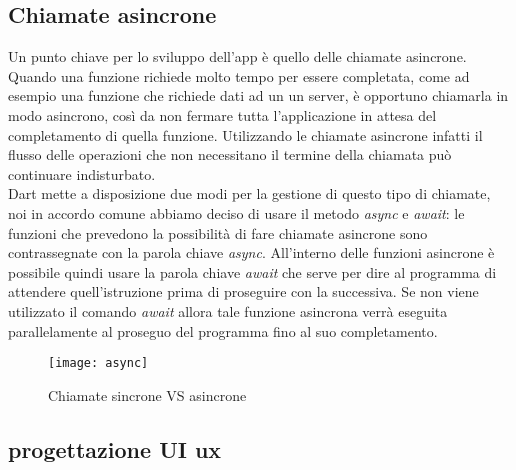 \subsection{Chiamate asincrone}
Un punto chiave per lo sviluppo dell'app è quello delle chiamate asincrone.\\
Quando una funzione richiede molto tempo per essere completata, come ad esempio una funzione che richiede dati ad un un server, è opportuno chiamarla in modo asincrono, così da non fermare tutta l'applicazione in attesa del completamento di quella funzione. Utilizzando le chiamate asincrone infatti il flusso delle operazioni che non necessitano il termine della chiamata può continuare indisturbato.\\
Dart mette a disposizione due modi per la gestione di questo tipo di chiamate, noi in accordo comune abbiamo deciso di usare il metodo \textit{async} e \textit{await}: le funzioni che prevedono la possibilità di fare chiamate asincrone sono contrassegnate con la parola chiave \textit{async}. All'interno delle funzioni asincrone è possibile quindi usare la parola chiave \textit{await} che serve per dire al programma di attendere quell'istruzione prima di proseguire con la successiva. Se non viene utilizzato il comando \textit{await} allora tale funzione asincrona verrà eseguita parallelamente al proseguo del programma fino al suo completamento.\\
\begin{figure}[h!]
    \centering
    \texttt{[image: async]}
    \caption{Chiamate sincrone VS asincrone}
\end{figure}
\subsection{progettazione UI ux}

